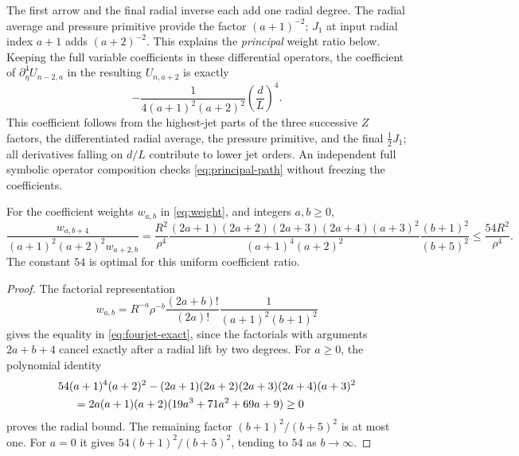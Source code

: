 The first arrow and the final radial inverse each add one radial
degree. The radial average and pressure primitive provide the
factor $(a+1)^{-2}$; $J_1$ at input radial index $a+1$ adds
$(a+2)^{-2}$. This explains the \emph{principal} weight ratio below.
Keeping the full variable coefficients in these differential operators,
the coefficient of $\partial_\eta^4U_{n-2,a}$ in the resulting
$U_{n,a+2}$ is exactly
\begin{equation}\label{eq:principal-path}
 -\frac{1}{4(a+1)^2(a+2)^2}\left(\frac{d}{L}\right)^4.
\end{equation}
This coefficient follows from the highest-jet parts of the three
successive $Z$ factors, the differentiated radial average, the
pressure primitive, and the final $\frac12J_1$; all derivatives
falling on $d/L$ contribute to lower jet orders. An independent
full symbolic operator composition checks \eqref{eq:principal-path}
without freezing the coefficients.

\begin{theorem}
\label{thm:pressure-fourjet}
For the coefficient weights $w_{a,b}$ in \eqref{eq:weight}, and
integers $a,b\ge0$,
\begin{equation}\label{eq:fourjet-exact}
 \frac{w_{a,b+4}}{(a+1)^2(a+2)^2 w_{a+2,b}}
 =\frac{R^2}{\rho^4}
 \frac{(2a+1)(2a+2)(2a+3)(2a+4)(a+3)^2}
 {(a+1)^4(a+2)^2}
 \frac{(b+1)^2}{(b+5)^2}
 \le\frac{54R^2}{\rho^4}.
\end{equation}
The constant $54$ is optimal for this uniform coefficient ratio.
\end{theorem}
\begin{proof}
The factorial representation
\[
 w_{a,b}=R^{-a}\rho^{-b}
 \frac{(2a+b)!}{(2a)!}\frac1{(a+1)^2(b+1)^2}
\]
gives the equality in \eqref{eq:fourjet-exact}, since the
factorials with arguments $2a+b+4$ cancel exactly after a
radial lift by two degrees. For $a\ge0$, the polynomial identity
\begin{align*}
&54(a+1)^4(a+2)^2-(2a+1)(2a+2)(2a+3)(2a+4)(a+3)^2\\
&\hspace{5mm}=2a(a+1)(a+2)(19a^3+71a^2+69a+9)\ge0
\end{align*}
proves the radial bound. The remaining factor
$(b+1)^2/(b+5)^2$ is at most one. For $a=0$ it gives
$54(b+1)^2/(b+5)^2$, tending to $54$ as $b\to\infty$.
\end{proof}

